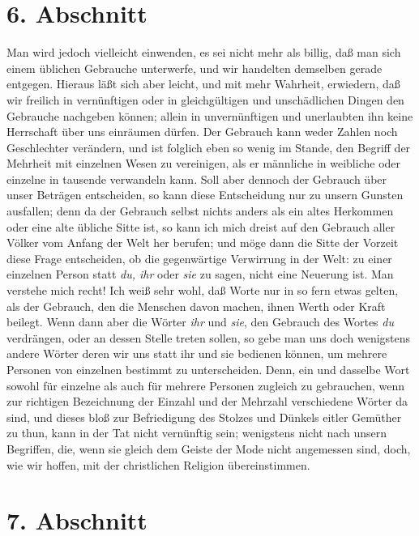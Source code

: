 \section{6. Abschnitt} \label{kap10_ab6}

Man wird jedoch vielleicht einwenden, es sei
nicht mehr als billig, daß man sich
einem üblichen Gebrauche unterwerfe, und wir handelten demselben gerade
entgegen. Hieraus läßt sich aber leicht, und mit mehr Wahrheit, erwiedern, daß
wir freilich in vernünftigen oder in gleichgültigen und unschädlichen Dingen den
Gebrauche nachgeben können; allein in unvernünftigen und unerlaubten ihn keine
Herrschaft über uns einräumen dürfen. Der Gebrauch kann weder Zahlen noch
Geschlechter verändern, und ist folglich eben so wenig im Stande, den Begriff
der Mehrheit mit einzelnen Wesen zu vereinigen, als er männliche in weibliche
oder einzelne in tausende verwandeln kann. Soll aber dennoch der Gebrauch über
unser Beträgen entscheiden, so kann diese Entscheidung nur zu unsern Gunsten
ausfallen; denn da der Gebrauch selbst nichts anders als ein altes Herkommen
oder eine alte übliche Sitte ist, so kann ich mich dreist auf den Gebrauch aller
Völker vom Anfang der Welt her berufen; und möge dann die Sitte der Vorzeit
diese Frage entscheiden, ob die gegenwärtige Verwirrung in der Welt: zu einer
einzelnen Person statt \textit{du, ihr} oder \textit{sie} zu sagen, nicht eine
Neuerung
ist.  Man verstehe mich recht! Ich weiß sehr wohl,
daß Worte nur in so fern etwas
gelten, als der Gebrauch, den die Menschen davon machen, ihnen Werth oder Kraft
beilegt. Wenn dann aber die Wörter \textit{ihr} und \textit{sie}, den Gebrauch
des Wortes
\textit{du} verdrängen, oder an dessen Stelle treten sollen, so gebe man uns
doch
wenigstens andere Wörter deren wir uns statt ihr und sie bedienen können, um
mehrere Personen von einzelnen bestimmt zu unterscheiden. Denn, ein und dasselbe
Wort sowohl für einzelne als auch für mehrere Personen zugleich zu gebrauchen,
wenn zur richtigen Bezeichnung der Einzahl und der Mehrzahl verschiedene Wörter
da sind, und dieses bloß zur Befriedigung des Stolzes und Dünkels eitler
Gemüther zu thun, kann in der Tat nicht vernünftig sein; wenigstens nicht nach
unsern Begriffen, die, wenn sie gleich dem Geiste der Mode nicht angemessen
sind, doch, wie wir hoffen, mit der christlichen Religion übereinstimmen.

\section{7. Abschnitt} \label{kap10_ab7}

